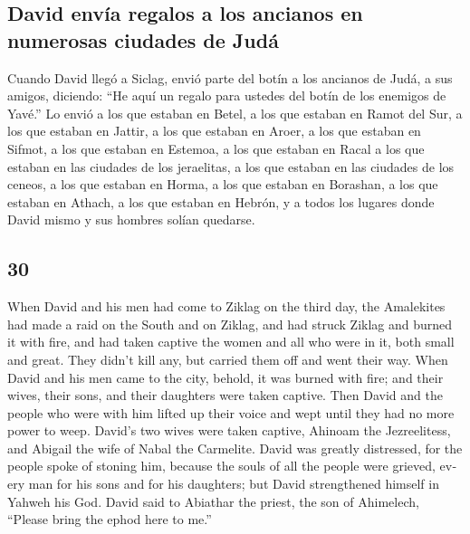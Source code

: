 \begin{paracol}{2}
\hypertarget{david-envuxeda-regalos-a-los-ancianos-en-numerosas-ciudades-de-juduxe1}{%
\subsection{David envía regalos a los ancianos en numerosas ciudades de
Judá}\label{david-envuxeda-regalos-a-los-ancianos-en-numerosas-ciudades-de-juduxe1}}

 Cuando David llegó a Siclag, envió parte del botín a los
ancianos de Judá, a sus amigos, diciendo: ``He aquí un regalo para
ustedes del botín de los enemigos de Yavé.''  Lo envió a
los que estaban en Betel, a los que estaban en Ramot del Sur, a los que
estaban en Jattir,  a los que estaban en Aroer, a los que
estaban en Sifmot, a los que estaban en Estemoa,  a los
que estaban en Racal a los que estaban en las ciudades de los
jeraelitas, a los que estaban en las ciudades de los ceneos,
 a los que estaban en Horma, a los que estaban en
Borashan, a los que estaban en Athach,  a los que estaban
en Hebrón, y a todos los lugares donde David mismo y sus hombres solían
quedarse.

\switchcolumn
\begin{otherlanguage}{english}

\hypertarget{section-59}{%
\section{30}\label{section-59}}

 When David and his men had come to Ziklag on the third
day, the Amalekites had made a raid on the South and on Ziklag, and had
struck Ziklag and burned it with fire,  and had taken
captive the women and all who were in it, both small and great. They
didn't kill any, but carried them off and went their way. 
When David and his men came to the city, behold, it was burned with
fire; and their wives, their sons, and their daughters were taken
captive.  Then David and the people who were with him
lifted up their voice and wept until they had no more power to weep.
 David's two wives were taken captive, Ahinoam the
Jezreelitess, and Abigail the wife of Nabal the Carmelite.
 David was greatly distressed, for the people spoke of
stoning him, because the souls of all the people were grieved, every man
for his sons and for his daughters; but David strengthened himself in
Yahweh his God.  David said to Abiathar the priest, the
son of Ahimelech, ``Please bring the ephod here to me.''


\end{otherlanguage}
\end{paracol}
